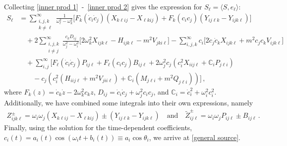 \documentclass[letterpaper,11pt]{article}
\newcommand{\oi}{\omega_i}
\newcommand{\oj}{\omega_j}
\newcommand{\ok}{\omega_k}
\newcommand{\ol}{\omega_\ell}
\begin{document}
Collecting \eqref{inner prod 1}~\!-~\!\eqref{inner prod 2} gives the expression for $S_\ell = \langle S, e_\ell \rangle$:
\begin{align}
\label{S intermediate}
S_\ell &= \sum_{\substack{i, j, k \\ k \neq \ell}}^\infty \frac{1}{\ol^2 - \ok^2} \Big[ F_k(\dot c_i \dot c_j) \left(X_{k\ell i j} - X_{\ell k i j} \right) + F_k(c_i c_j) \left(Y_{ij\ell k} - Y_{ijk\ell} \right) \Big] \nonumber \\
%
& \quad +2 \sum_{\substack{i,j,k \\ i \neq j}}^\infty \frac{c_k D_{ij}}{\oj^2 - \oi^2} \Big[  2\ok^2 X_{ijk\ell} - H_{ijk\ell} -m^2 V_{jki\ell} \Big] - \sum_{i,j,k}^\infty c_i \Big[ 2 \dot c_j \dot c_k X_{ijk\ell} + m^2 c_j c_k V_{ijk\ell} \Big] \nonumber \\ 
%
& \quad + \sum_{i,j}^\infty \Big[ F_\ell (\dot c_i \dot c_j) P_{ij\ell} + F_\ell (c_i c_j) B_{ij\ell} + 2\oj^2 c_j \left( c_i^2 X_{iij\ell} + \mathbb C_i P_{j\ell i} \right) \nonumber \\
%
& \qquad - c_j \left( c^2_i (H_{iij\ell} + m^2 V_{jii\ell} ) + \mathbb C_i (M_{j\ell i} + m^2 Q_{j\ell i}) \right) \Big] \, ,
\end{align}
where $F_k(z) = \dot c_k \dot z - 2\ok^2 c_k z$, $D_{ij} = \dot c_i \dot c_j + \omega^2_j c_i c_j$, and $\mathbb C_i = \dot c_i^2 + \oi^2 c_i^2$. Additionally, we have combined some integrals into their own expressions, namely
\begin{align}
Z^{\pm}_{ijk\ell} = \oi \oj \left( X_{k\ell ij} - X_{\ell kij} \right) \pm \left( Y_{ij\ell k} - Y_{ijk\ell} \right) \quad \text{and} \quad \tilde Z^{\pm}_{ij\ell} = \oi \oj P_{ij\ell} \pm B_{ij\ell} \, .
\end{align}
Finally, using the solution for the time-dependent coefficients, $c_i(t) = a_i(t) \cos \left( \omega_i t + b_i (t) \right) \equiv a_i \cos \theta_i$, we arrive at \eqref{general source}.

\end{document}
